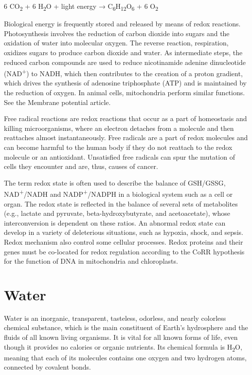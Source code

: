 6 CO\textsubscript{2} + 6 H\textsubscript{2}O + light energy → C\textsubscript{6}H\textsubscript{12}O\textsubscript{6} + 6 O\textsubscript{2}

Biological energy is frequently stored and released by means of redox reactions. Photosynthesis involves the reduction of carbon dioxide into sugars and the oxidation of water into molecular oxygen. The reverse reaction, respiration, oxidizes sugars to produce carbon dioxide and water. As intermediate steps, the reduced carbon compounds are used to reduce nicotinamide adenine dinucleotide (NAD\textsuperscript{+}) to NADH, which then contributes to the creation of a proton gradient, which drives the synthesis of adenosine triphosphate (ATP) and is maintained by the reduction of oxygen. In animal cells, mitochondria perform similar functions. See the Membrane potential article.

Free radical reactions are redox reactions that occur as a part of homeostasis and killing microorganisms, where an electron detaches from a molecule and then reattaches almost instantaneously. Free radicals are a part of redox molecules and can become harmful to the human body if they do not reattach to the redox molecule or an antioxidant. Unsatisfied free radicals can spur the mutation of cells they encounter and are, thus, causes of cancer.

The term redox state is often used to describe the balance of GSH/GSSG, NAD\textsuperscript{+}/NADH and NADP\textsuperscript{+}/NADPH in a biological system such as a cell or organ. The redox state is reflected in the balance of several sets of metabolites (e.g., lactate and pyruvate, beta-hydroxybutyrate, and acetoacetate), whose interconversion is dependent on these ratios. An abnormal redox state can develop in a variety of deleterious situations, such as hypoxia, shock, and sepsis. Redox mechanism also control some cellular processes. Redox proteins and their genes must be co-located for redox regulation according to the CoRR hypothesis for the function of DNA in mitochondria and chloroplasts.

\hypertarget{water}{%
\section{Water}\label{water}}

Water is an inorganic, transparent, tasteless, odorless, and nearly colorless chemical substance, which is the main constituent of Earth's hydrosphere and the fluids of all known living organisms. It is vital for all known forms of life, even though it provides no calories or organic nutrients. Its chemical formula is H\textsubscript{2}O, meaning that each of its molecules contains one oxygen and two hydrogen atoms, connected by covalent bonds.

